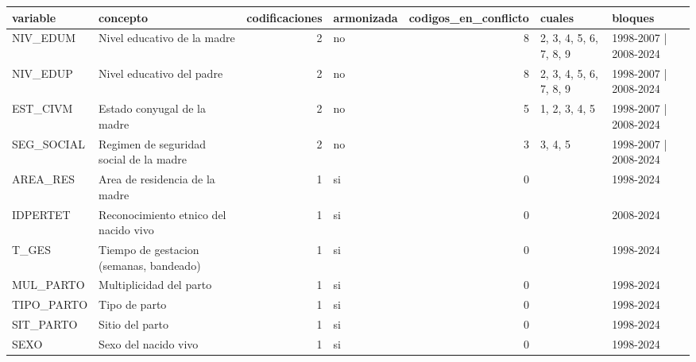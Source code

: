 \begin{tabular}{llrlrll}
\toprule
variable & concepto & codificaciones & armonizada & codigos\_en\_conflicto & cuales & bloques \\
\midrule
NIV\_EDUM & Nivel educativo de la madre & 2 & no & 8 & 2, 3, 4, 5, 6, 7, 8, 9 & 1998-2007 | 2008-2024 \\
NIV\_EDUP & Nivel educativo del padre & 2 & no & 8 & 2, 3, 4, 5, 6, 7, 8, 9 & 1998-2007 | 2008-2024 \\
EST\_CIVM & Estado conyugal de la madre & 2 & no & 5 & 1, 2, 3, 4, 5 & 1998-2007 | 2008-2024 \\
SEG\_SOCIAL & Regimen de seguridad social de la madre & 2 & no & 3 & 3, 4, 5 & 1998-2007 | 2008-2024 \\
AREA\_RES & Area de residencia de la madre & 1 & si & 0 &  & 1998-2024 \\
IDPERTET & Reconocimiento etnico del nacido vivo & 1 & si & 0 &  & 2008-2024 \\
T\_GES & Tiempo de gestacion (semanas, bandeado) & 1 & si & 0 &  & 1998-2024 \\
MUL\_PARTO & Multiplicidad del parto & 1 & si & 0 &  & 1998-2024 \\
TIPO\_PARTO & Tipo de parto & 1 & si & 0 &  & 1998-2024 \\
SIT\_PARTO & Sitio del parto & 1 & si & 0 &  & 1998-2024 \\
SEXO & Sexo del nacido vivo & 1 & si & 0 &  & 1998-2024 \\
\bottomrule
\end{tabular}
